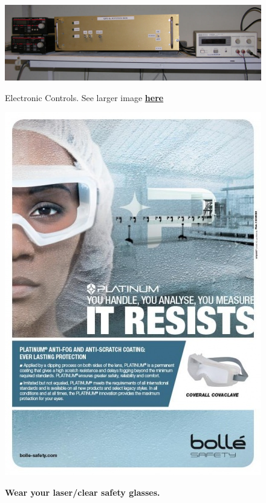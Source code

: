 \documentclass{../lab}
\begin{document}
\begin{figure}[H]
\centering
\begin{minipage}{0.8\textwidth}
    \href{http://experimentationlab.berkeley.edu/sites/default/files/images/OTZ_Controls_0142B.jpg}{\includegraphics[width=\linewidth,keepaspectratio]{images/OTZ_Controls_0142B.jpg}}
    \caption{Electronic Controls. See larger image \href{http://experimentationlab.berkeley.edu/sites/default/files/images/OTZ_Controls_0142B.jpg}{\textbf{here}}}
\end{minipage}
\begin{minipage}{0.18\textwidth}
    \href{http://experimentationlab.berkeley.edu/sites/default/files/upimages/7_eye-wear-face.jpg}{\includegraphics[width=\linewidth,keepaspectratio]{images/7_eye-wear-face.jpg}}
    \caption{\textbf{Wear your laser/clear safety glasses.}}
\end{minipage}
\end{figure}
\end{document}
